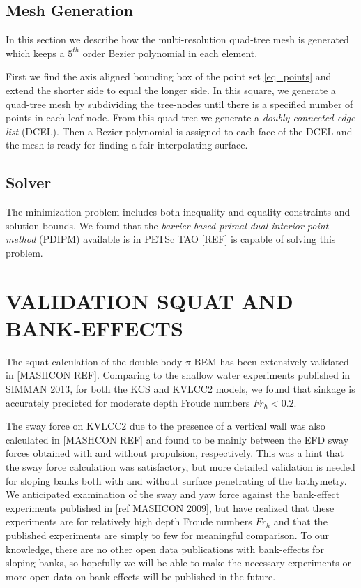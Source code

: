\documentclass[A4paper,11pt]{marine_2023_Paper}
\begin{document}
\subsection{Mesh Generation}
In this section we describe how the multi-resolution quad-tree mesh is generated which keeps a $5^{th}$ order Bezier polynomial in each element.

First we find the axis aligned bounding box of the point set \eqref{eq_points} and extend the shorter side to equal the longer side. In this square, we generate a quad-tree mesh by subdividing the tree-nodes until there is a specified number of points in each leaf-node. From this quad-tree we generate a \emph{doubly connected edge list} (DCEL). Then a Bezier polynomial is assigned to each face of the DCEL and the mesh is ready for finding a fair interpolating surface.

\subsection{Solver}
The minimization problem includes both inequality and equality constraints and solution bounds. We found that the \emph{barrier-based primal-dual interior point method} (PDIPM) available is in PETSc TAO [REF] is capable of solving this problem.

\section{VALIDATION SQUAT AND BANK-EFFECTS}
The squat calculation of the double body $\pi$-BEM has been extensively validated in [MASHCON REF]. Comparing to the shallow water experiments published in SIMMAN 2013, for both the KCS and KVLCC2 models, we found that sinkage is accurately predicted for moderate depth Froude numbers $Fr_h<0.2$. 

The sway force on KVLCC2 due to the presence of a vertical wall was also calculated in [MASHCON REF] and found to be mainly between the EFD sway forces obtained with and without propulsion, respectively. This was a hint that the sway force calculation was satisfactory, but more detailed validation is needed for sloping banks both with and without surface penetrating of the bathymetry. We anticipated examination of the sway and yaw force against the bank-effect experiments published in [ref MASHCON 2009], but have realized that these experiments are for relatively high depth Froude numbers $Fr_h$ and that the published experiments are simply to few for meaningful comparison. To our knowledge, there are no other open data publications with bank-effects for sloping banks, so hopefully we will be able to make the necessary experiments or more open data on bank effects will be published in the future.  
\end{document}
